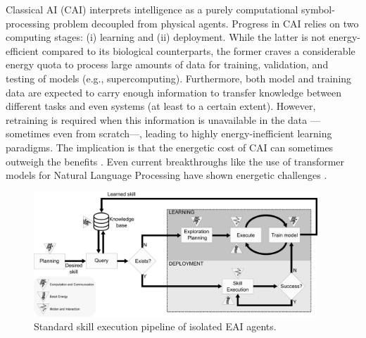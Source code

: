 \documentclass[12pt]{article}
\begin{document}
Classical AI (CAI) interprets intelligence as a purely computational symbol-processing problem decoupled from physical agents. Progress in CAI relies on two computing stages: (i) learning and (ii) deployment. While the latter is not energy-efficient compared to its biological counterparts, the former craves a considerable energy quota to process large amounts of data for training, validation, and testing of models (e.g., supercomputing). Furthermore, both model and training data are expected to carry enough information to transfer knowledge between different tasks and even systems (at least to a certain extent). However, retraining is required when this information is unavailable in the data ---sometimes even from scratch---, leading to highly energy-inefficient learning paradigms. The implication is that the energetic cost of CAI can sometimes outweigh the benefits \cite{Strubell2019EnergyPolicyConsiderations}. Even current breakthroughs like the use of transformer models for Natural Language Processing have shown energetic challenges \cite{Cao2020TowardsAccurateReliable}.
\begin{figure}[!t]
	\centering
	\includegraphics[width=0.95\textwidth]{fig/embodied_ai_learning_pipeline_v7.png}
	\caption{Standard skill execution pipeline of isolated EAI agents.}
	\label{fig:embodied_ai_pipeline}
\end{figure}
\end{document}
